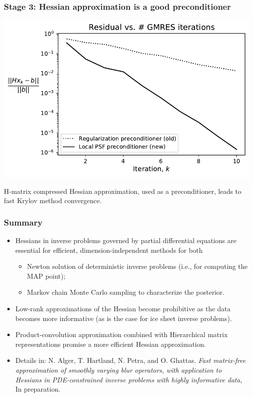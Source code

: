 \documentclass[10pt,final,xcolor=dvipsnames]{beamer}
\begin{document}
\begin{frame}
	\frametitle{Stage 3: Hessian approximation is a good preconditioner}
	\begin{center}
		\includegraphics[width=0.75\columnwidth]{ice_gmres_convergence.pdf}
	\end{center}
\begin{center}
	H-matrix compressed Hessian approximation, used as a preconditioner, leads to fast Krylov method convergence.
\end{center}
\end{frame}
\begin{frame}
  \frametitle{Summary}

  \begin{itemize}
  \item Hessians in inverse problems governed by
    partial differential equations are essential for
    efficient, dimension-independent methods for both
    \begin{itemize}
    \item Newton solution of deterministic inverse problems (i.e., for
      computing the MAP point);
      \vspace{0.05in}
    \item Markov chain Monte Carlo sampling to characterize the
      posterior.
    \end{itemize}
    \vspace{0.05in}
  \item Low-rank approximations of the Hessian become
    prohibitive as the data becomes more informative (as is the case
    for ice sheet inverse problems).
    \vspace{0.05in}
  \item Product-convolution approximation combined with Hierarchical matrix representations promise a more efficient
    Hessian approximation.
  \end{itemize}
    \vspace{0.2in}
  \begin{itemize}
  \item [] \scriptsize{Details in: N. Alger, T. Hartland, N. Petra,
    and O. Ghattas. {\em Fast matrix-free approximation of smoothly
      varying blur operators, with application to Hessians in
      PDE-constrained inverse problems with highly informative data},
    In preparation.}
  \end{itemize}
\end{frame}
\end{document}
